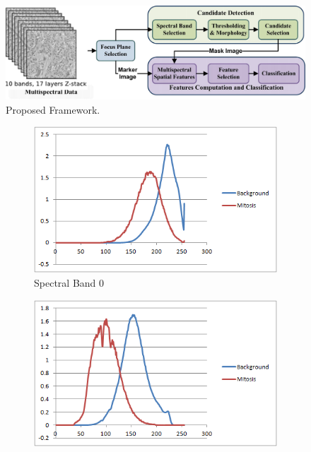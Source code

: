 \documentclass[10pt,twocolumn,letterpaper]{article}
\begin{document}
\begin{figure}
	\centering
	\includegraphics[width=\textwidth]{diagrams/framework.jpg}
	\caption{Proposed Framework.}
	\label{fig:framework}
\end{figure}

\begin{figure}[b]
	\centering
	\begin{subfigure}[b]{0.22\textwidth}
		\includegraphics[width=\textwidth]{diagrams/Band0.png}
		\caption*{Spectral Band 0}
	\end{subfigure}
	\begin{subfigure}[b]{0.22\textwidth}
		\includegraphics[width=\textwidth]{diagrams/Band1.png}

\end{subfigure}
\end{figure}
\end{document}
